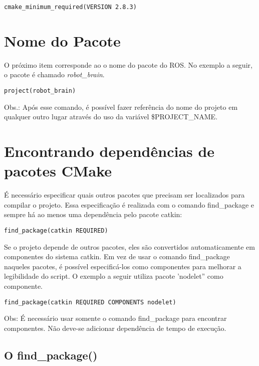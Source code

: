 \begin{verbatim} 
cmake_minimum_required(VERSION 2.8.3)
\end{verbatim}

\section{Nome do Pacote}

O próximo item corresponde ao o nome do pacote do ROS. No exemplo a seguir, o pacote é chamado \textit{robot\_brain}.

\begin{verbatim} 
project(robot_brain)
\end{verbatim}

Obs.: Após esse comando, é possível fazer referência do nome do projeto em qualquer outro lugar através do uso da variável \${PROJECT\_NAME}.

\section{Encontrando dependências de pacotes CMake}

É necessário especificar quais outros pacotes que precisam ser localizados para compilar o projeto. Essa especificação é realizada com o comando find\_package e sempre há ao menos uma dependência pelo pacote catkin:

\begin{verbatim} 
find_package(catkin REQUIRED)
\end{verbatim}

Se o projeto depende de outros pacotes, eles são convertidos automaticamente em componentes do sistema catkin. Em vez de usar o comando  find\_package naqueles pacotes, é possível especificá-los como componentes para melhorar a legibilidade do script. O exemplo a seguir utiliza pacote 'nodelet'' como componente.

\begin{verbatim} 
find_package(catkin REQUIRED COMPONENTS nodelet)
\end{verbatim}

Obs: É necessário usar somente o comando find\_package para encontrar componentes. Não deve-se adicionar dependência de tempo de execução.

\subsection{O find\_package()}

